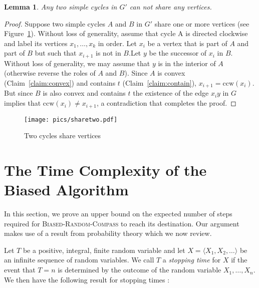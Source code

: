 \documentclass [letterpaper] {article}
\newcommand{\ccw}{\mathrm{ccw}}
\newtheorem{lemma}{Lemma}%
\begin{document}

\begin{lemma}
\label{lemma:disjoint}
  Any two simple  cycles in $G'$ can not share any vertices.
\end{lemma}

\begin{proof}
Suppose two simple cycles $A$ and $B$ in $G'$ share one or more vertices (see Figure~\ref{fig:share}). Without loss of generality, assume that cycle A is directed clockwise and label its vertices $x_1,\ldots,x_k$ in order.  Let $x_i$ be a vertex that is part of $A$ and part of $B$ but such that $x_{i+1}$ is not in $B$.Let $y$ be the successor of $x_i$ in $B$.  Without loss of generality, we may assume that $y$ is in the interior of $A$ (otherwise reverse the roles of $A$ and $B$).  Since $A$ is convex (Claim~\ref{claim:convex}) and contains $t$ (Claim~\ref{claim:contain}), $x_{i+1} = \ccw(x_i)$.  But since $B$ is also convex and contains $t$ the existence of the edge $x_iy$ in $G$ implies that $\ccw(x_i)\neq x_{i+1}$, a contradiction that completes the proof.
\end{proof}

\begin{figure}[ht]
  \centering
    \texttt{[image: pics/sharetwo.pdf]}
  \caption{Two cycles share vertices}
  \label{fig:share}
\end{figure}


\section{The Time Complexity of the Biased Algorithm}
\label{sec:algo}
\label{sec:analysis}

In this section, we prove an upper bound on the expected number of steps required for \textsc{Biased-Random-Compass} to reach its destination.  Our argument makes use of a result from probability theory which we now review.  

Let $T$ be a positive, integral, finite random variable and let $X=\langle X_1,X_2,\ldots\rangle$ be an infinite sequence of random variables.  We call $T$ a \emph{stopping time} for $X$ if the event that $T = n$ is determined by the outcome of the random variable $X_{1}, \ldots, X_{n}$.  We then have the following result for stopping times \cite[Chapter 6]{Ross01}:
\end{document}
